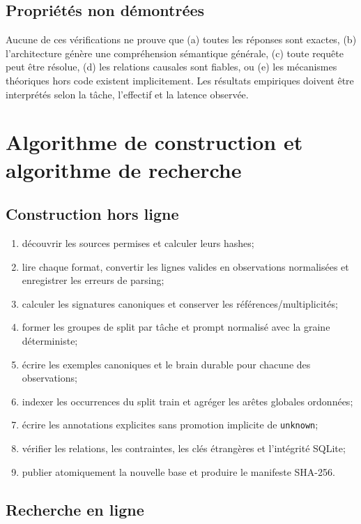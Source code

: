 \documentclass[11pt,a4paper,openany]{book}
\begin{document}
\section{Propriétés non démontrées}
Aucune de ces vérifications ne prouve que (a) toutes les réponses sont exactes, (b) l'architecture génère une compréhension sémantique générale, (c) toute requête peut être résolue, (d) les relations causales sont fiables, ou (e) les mécanismes théoriques hors code existent implicitement. Les résultats empiriques doivent être interprétés selon la tâche, l'effectif et la latence observée.

\chapter{Algorithme de construction et algorithme de recherche}
\section{Construction hors ligne}
\begin{enumerate}
\item découvrir les sources permises et calculer leurs hashes;
\item lire chaque format, convertir les lignes valides en observations normalisées et enregistrer les erreurs de parsing;
\item calculer les signatures canoniques et conserver les références/multiplicités;
\item former les groupes de split par tâche et prompt normalisé avec la graine déterministe;
\item écrire les exemples canoniques et le brain durable pour chacune des observations;
\item indexer les occurrences du split train et agréger les arêtes globales ordonnées;
\item écrire les annotations explicites sans promotion implicite de \texttt{unknown};
\item vérifier les relations, les contraintes, les clés étrangères et l'intégrité SQLite;
\item publier atomiquement la nouvelle base et produire le manifeste SHA-256.
\end{enumerate}

\section{Recherche en ligne}
\end{document}
